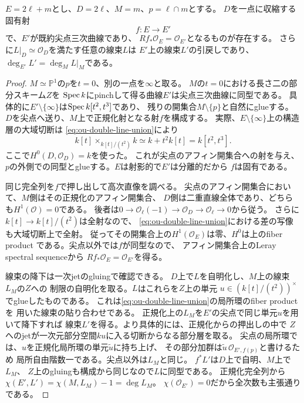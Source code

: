 \begin{lemma}[二重直線の縮約と線束の降下]
\label{lem:ou-double-line-contraction}
$E=2\ell+m$とし、$D=2\ell$、$M=m$、$p=\ell\cap m$とする。
$D$を一点に収縮する固有射
\[
 f:E\longrightarrow E'
\]
で、$E'$が既約尖点三次曲線であり、
$Rf_*\mathcal O_E=\mathcal O_{E'}$となるものが存在する。
さらに$L|_D\simeq\mathcal O_D$を満たす任意の線束$L$は
$E'$上の線束$L'$の引戻しであり、
$\deg_{E'}L'=\deg_M L|_M$である。
\end{lemma}
\begin{proof}
$M\simeq\mathbb P^1$の$p$を$t=0$、別の一点を$\infty$と取る。
$M$の$t=0$における長さ二の部分スキーム$Z$を
$\operatorname{Spec} k$にpinchして得る曲線$E'$は尖点三次曲線に同型である。
具体的に$E'\setminus\{\infty\}$は$\operatorname{Spec} k[t^2,t^3]$であり、
残りの開集合$M\setminus\{p\}$と自然にglueする。
$D$を尖点へ送り、$M$上で正規化射となる射$f$を構成する。
実際、$E\setminus\{\infty\}$上の構造層の大域切断は
\eqref{eq:ou-double-line-union}により
\[
 k[t]\times_{k[t]/(t^2)} k
 \simeq k+t^2k[t]=k[t^2,t^3].
\]
ここで$H^0(D,\mathcal O_D)=k$を使った。
これが尖点のアフィン開集合への射を与え、
$p$の外側での同型とglueする。$E$は射影的で$E'$は分離的だから
$f$は固有である。

同じ完全列を$f$で押し出して高次直像を調べる。
尖点のアフィン開集合において、$M$側はその正規化のアフィン開集合、
$D$側は二重直線全体であり、どちらも$H^1(\mathcal O)=0$である。
後者は$0\to\mathcal O_\ell(-1)\to\mathcal O_D
\to\mathcal O_\ell\to0$から従う。
さらに$k[t]\to k[t]/(t^2)$は全射なので、
\eqref{eq:ou-double-line-union}における差の写像も大域切断上で全射。
従ってその開集合上の$H^1(\mathcal O_E)$は零、$H^0$は上のfiber product
である。尖点以外では$f$が同型なので、
アフィン開集合上のLeray spectral sequenceから
$Rf_*\mathcal O_E=\mathcal O_{E'}$を得る。

線束の降下は一次jetのgluingで確認できる。
$D$上で$L$を自明化し、$M$上の線束$L_M$の$Z$への
制限の自明化を取る。$L$はこれらを$Z$上の単元
$u\in(k[t]/(t^2))^\times$でglueしたものである。
これは\eqref{eq:ou-double-line-union}の局所環のfiber productを
用いた線束の貼り合わせである。
正規化上の$L_M$を$E'$の尖点で同じ単元$u$を用いて降下すれば
線束$L'$を得る。より具体的には、正規化からの押出しの中で
$Z$へのjetが一次元部分空間$ku$に入る切断からなる部分層を取る。
尖点の局所環では、$u$を正規化局所環の単元$\widetilde u$に持ち上げ、
その部分加群は$\widetilde u\,\mathcal O_{E',f(p)}$と書けるため
局所自由階数一である。尖点以外は$L_M$と同じ。
$f^*L'$は$D$上で自明、$M$上で$L_M$、
$Z$上のgluingも構成から同じなので$L$に同型である。
正規化完全列から$\chi(E',L')=\chi(M,L_M)-1=\deg L_M$。
$\chi(\mathcal O_{E'})=0$だから全次数も主張通りである。
\end{proof}

